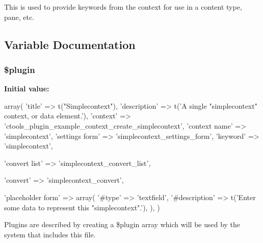 This is used to provide keywords from the context for use in a content type, pane, etc. 

\subsection{Variable Documentation}
\hypertarget{simplecontext_8inc_ada8a7130088351710bb02ed622d6bf65}{
\subsubsection[{\$plugin}]{\setlength{\rightskip}{0pt plus 5cm}\$plugin}}
\label{simplecontext_8inc_ada8a7130088351710bb02ed622d6bf65}
{\bfseries Initial value:}
\begin{DoxyCode}
 array(
  'title' => t("Simplecontext"),
  'description' => t('A single "simplecontext" context, or data element.'),
  'context' => 'ctools_plugin_example_context_create_simplecontext',  
  'context name' => 'simplecontext',
  'settings form' => 'simplecontext_settings_form',
  'keyword' => 'simplecontext',

  
  'convert list' => 'simplecontext_convert_list',
  
  'convert' => 'simplecontext_convert',

  'placeholder form' => array(
    '#type' => 'textfield',
    '#description' => t('Enter some data to represent this "simplecontext".'),
  ),
)
\end{DoxyCode}
Plugins are described by creating a \$plugin array which will be used by the system that includes this file. 